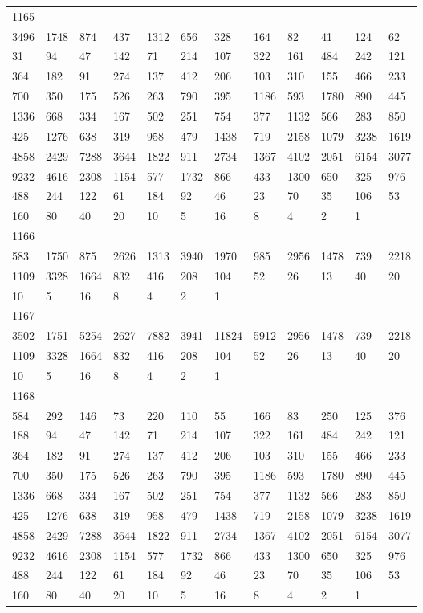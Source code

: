\begin{longtable}{llllllllllll}
1165&&&&&&&&&&&\\
3496& 1748& 874& 437& 1312& 656& 328& 164& 82& 41& 124& 62\\
31& 94& 47& 142& 71& 214& 107& 322& 161& 484& 242& 121\\
364& 182& 91& 274& 137& 412& 206& 103& 310& 155& 466& 233\\
700& 350& 175& 526& 263& 790& 395& 1186& 593& 1780& 890& 445\\
1336& 668& 334& 167& 502& 251& 754& 377& 1132& 566& 283& 850\\
425& 1276& 638& 319& 958& 479& 1438& 719& 2158& 1079& 3238& 1619\\
4858& 2429& 7288& 3644& 1822& 911& 2734& 1367& 4102& 2051& 6154& 3077\\
9232& 4616& 2308& 1154& 577& 1732& 866& 433& 1300& 650& 325& 976\\
488& 244& 122& 61& 184& 92& 46& 23& 70& 35& 106& 53\\
160& 80& 40& 20& 10& 5& 16& 8& 4& 2& 1& \\

1166&&&&&&&&&&&\\
583& 1750& 875& 2626& 1313& 3940& 1970& 985& 2956& 1478& 739& 2218\\
1109& 3328& 1664& 832& 416& 208& 104& 52& 26& 13& 40& 20\\
10& 5& 16& 8& 4& 2& 1& \\

1167&&&&&&&&&&&\\
3502& 1751& 5254& 2627& 7882& 3941& 11824& 5912& 2956& 1478& 739& 2218\\
1109& 3328& 1664& 832& 416& 208& 104& 52& 26& 13& 40& 20\\
10& 5& 16& 8& 4& 2& 1& \\

1168&&&&&&&&&&&\\
584& 292& 146& 73& 220& 110& 55& 166& 83& 250& 125& 376\\
188& 94& 47& 142& 71& 214& 107& 322& 161& 484& 242& 121\\
364& 182& 91& 274& 137& 412& 206& 103& 310& 155& 466& 233\\
700& 350& 175& 526& 263& 790& 395& 1186& 593& 1780& 890& 445\\
1336& 668& 334& 167& 502& 251& 754& 377& 1132& 566& 283& 850\\
425& 1276& 638& 319& 958& 479& 1438& 719& 2158& 1079& 3238& 1619\\
4858& 2429& 7288& 3644& 1822& 911& 2734& 1367& 4102& 2051& 6154& 3077\\
9232& 4616& 2308& 1154& 577& 1732& 866& 433& 1300& 650& 325& 976\\
488& 244& 122& 61& 184& 92& 46& 23& 70& 35& 106& 53\\
160& 80& 40& 20& 10& 5& 16& 8& 4& 2& 1& \\


\end{longtable}
